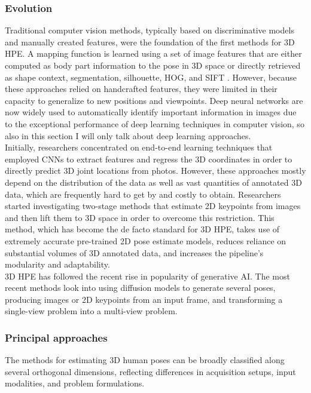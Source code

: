\subsubsection{Evolution}
Traditional computer vision methods, typically based on discriminative models and manually created features, were the foundation of the first methods for 3D HPE. A mapping function is learned using a set of image features that are 
either computed as body part information to the pose in 3D space or directly retrieved as shape context, segmentation, silhouette, HOG, and SIFT \cite{lowe1999object}. However, because these approaches relied on handcrafted features, they were limited in 
their capacity to generalize to new positions and viewpoints. Deep neural networks are now widely used to automatically identify important information in images due to the exceptional performance of deep learning techniques in computer 
vision, so also in this section I will only talk about deep learning approaches.\\
Initially, researchers concentrated on end-to-end learning techniques that employed CNNs to extract features and regress the 3D coordinates in order to directly predict 3D joint locations from photos. However, these approaches mostly 
depend on the distribution of the data as well as vast quantities of annotated 3D data, which are frequently hard to get by and costly to obtain. Researchers started investigating two-stage methods that estimate 2D keypoints from 
images and then lift them to 3D space in order to overcome this restriction. This method, which has become the de facto standard for 3D HPE, takes use of extremely accurate pre-trained 2D pose estimate models, reduces reliance on 
substantial volumes of 3D annotated data, and increases the pipeline's modularity and adaptability.\\
3D HPE has followed the recent rise in popularity of generative AI. The most recent methods look into using diffusion models to generate several poses, producing images or 2D keypoints from an input frame, and transforming a 
single-view problem into a multi-view problem.


\subsubsection{Principal approaches}
The methods for estimating 3D human poses can be broadly classified along several orthogonal dimensions, reflecting differences in acquisition setups, input modalities, and problem formulations.

